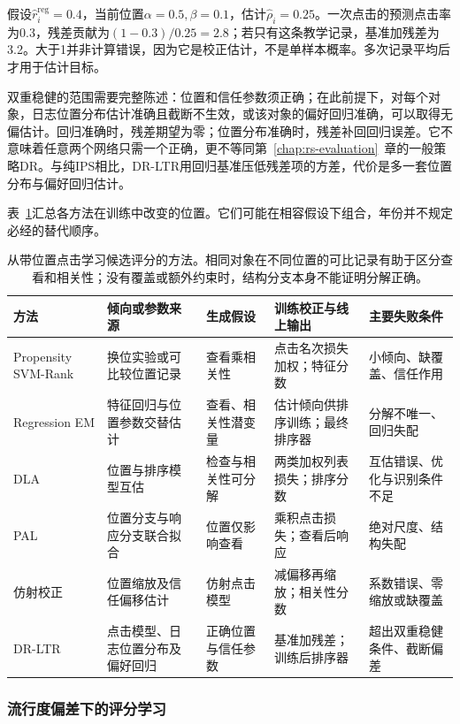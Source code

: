 假设$\widehat r_i^{\mathrm{reg}}=0.4$，当前位置$\alpha=0.5,\beta=0.1$，估计$\widehat\rho_i=0.25$。一次点击的预测点击率为0.3，残差贡献为$(1-0.3)/0.25=2.8$；若只有这条教学记录，基准加残差为3.2。大于1并非计算错误，因为它是校正估计，不是单样本概率。多次记录平均后才用于估计目标。

双重稳健的范围需要完整陈述：位置和信任参数须正确；在此前提下，对每个对象，日志位置分布估计准确且截断不生效，或该对象的偏好回归准确，可以取得无偏估计。回归准确时，残差期望为零；位置分布准确时，残差补回回归误差。它不意味着任意两个网络只需一个正确，更不等同第~\ref{chap:rs-evaluation}~章的一般策略DR。与纯IPS相比，DR-LTR用回归基准压低残差项的方差，代价是多一套位置分布与偏好回归估计。

表~\ref{tab:rs-position-methods}汇总各方法在训练中改变的位置。它们可能在相容假设下组合，年份并不规定必经的替代顺序。
\begin{table}[htbp]
 \centering\small
 \begin{tabularx}{\linewidth}{@{}lXXXX@{}}
 \toprule
 方法 & 倾向或参数来源 & 生成假设 & 训练校正与线上输出 & 主要失败条件\\
 \midrule
 Propensity SVM-Rank & 换位实验或可比较位置记录 & 查看乘相关性 & 点击名次损失加权；特征分数 & 小倾向、缺覆盖、信任作用\\
 Regression EM & 特征回归与位置参数交替估计 & 查看、相关性潜变量 & 估计倾向供排序训练；最终排序器 & 分解不唯一、回归失配\\
 DLA & 位置与排序模型互估 & 检查与相关性可分解 & 两类加权列表损失；排序分数 & 互估错误、优化与识别条件不足\\
 PAL & 位置分支与响应分支联合拟合 & 位置仅影响查看 & 乘积点击损失；查看后响应 & 绝对尺度、结构失配\\
 仿射校正 & 位置缩放及信任偏移估计 & 仿射点击模型 & 减偏移再缩放；相关性分数 & 系数错误、零缩放或缺覆盖\\
 DR-LTR & 点击模型、日志位置分布及偏好回归 & 正确位置与信任参数 & 基准加残差；训练后排序器 & 超出双重稳健条件、截断偏差\\
 \bottomrule
 \end{tabularx}
 \caption{从带位置点击学习候选评分的方法。相同对象在不同位置的可比记录有助于区分查看和相关性；没有覆盖或额外约束时，结构分支本身不能证明分解正确。}
 \label{tab:rs-position-methods}
\end{table}

\subsubsection{流行度偏差下的评分学习}
\label{sec:rs-popularity-bias}

